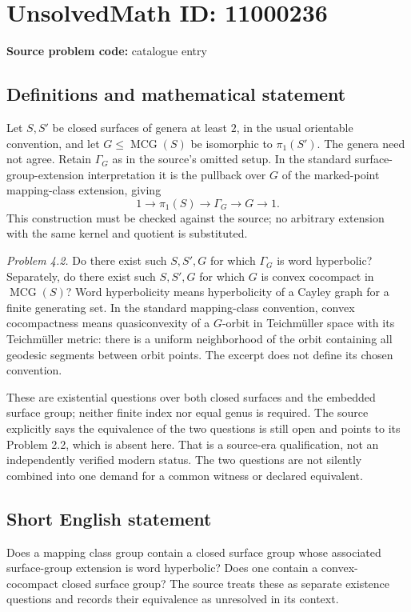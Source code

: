 \documentclass[11pt]{article}
\begin{document}
\section*{UnsolvedMath ID: 11000236}
\textbf{Source problem code:} catalogue entry
\subsection{Definitions and mathematical statement}
Let \(S,S'\) be closed surfaces of genera at least \(2\), in the usual orientable convention, and let \(G\leq\operatorname{MCG}(S)\) be isomorphic to \(\pi_1(S')\). The genera need not agree. Retain \(\Gamma_G\) as in the source's omitted setup. In the standard surface-group-extension interpretation it is the pullback over \(G\) of the marked-point mapping-class extension, giving
\[
 1\longrightarrow\pi_1(S)\longrightarrow\Gamma_G
 \longrightarrow G\longrightarrow1.
\]
This construction must be checked against the source; no arbitrary extension with the same kernel and quotient is substituted.

\emph{Problem 4.2.} Do there exist such \(S,S',G\) for which \(\Gamma_G\) is word hyperbolic? Separately, do there exist such \(S,S',G\) for which \(G\) is convex cocompact in \(\operatorname{MCG}(S)\)? Word hyperbolicity means hyperbolicity of a Cayley graph for a finite generating set. In the standard mapping-class convention, convex cocompactness means quasiconvexity of a \(G\)-orbit in Teichm\"uller space with its Teichm\"uller metric: there is a uniform neighborhood of the orbit containing all geodesic segments between orbit points. The excerpt does not define its chosen convention.

These are existential questions over both closed surfaces and the embedded surface group; neither finite index nor equal genus is required. The source explicitly says the equivalence of the two questions is still open and points to its Problem 2.2, which is absent here. That is a source-era qualification, not an independently verified modern status. The two questions are not silently combined into one demand for a common witness or declared equivalent.
\subsection{Short English statement}
Does a mapping class group contain a closed surface group whose associated surface-group extension is word hyperbolic? Does one contain a convex-cocompact closed surface group? The source treats these as separate existence questions and records their equivalence as unresolved in its context.
\end{document}
